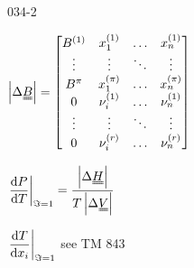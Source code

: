 \begin{mitframe}{034-2} %

 	
    \begin{listone}
 
    	\item $\left|\iipf\uuline{\exergy}\right|=        
        \begin{bmatrix}
    	\exergy^{(1)} & \specfrac{1}^{(1)} & \dots & \specfrac{n}^{(1)} \\
    	\vdots & \vdots & \ddots & \vdots \\
        \exergy^{\pie} & \specfrac{1}^{(\pie)} & \dots & \specfrac{n}^{(\pie)} \\
        0 & \chargeval^{(1)} & \dots & \nu_{n}^{(1)} \\
    	\vdots & \vdots & \ddots & \vdots \\
   	 	0 & \chargeval^{(\pos)} & \dots & \nu_{n}^{(\pos)} \\
		\end{bmatrix}
		$
        
        
        \item $\left.\dfrac{\mathrm{d}\p}{\mathrm{d}\Temp}\right|_{\dof=1} = \dfrac{\left|\iipf\uuline{\enthalpy}\right|}{\Temp\left|\iipf\uuline{\vol}\right|}$ 
        
        \item $\left.\dfrac{\mathrm{d}\Temp}{\mathrm{d}\specfrac{i}}\right|_{\dof=1}$ see TM 843
        
\end{listone}        
        
\end{mitframe}